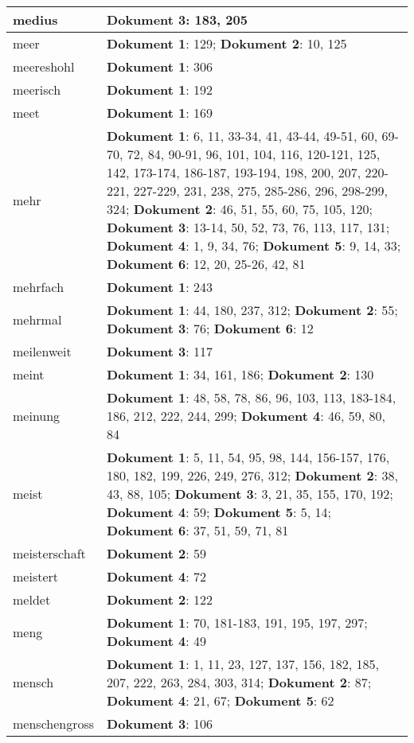\documentclass[a5paper]{article}
\begin{document}
\begin{longtable}[l]{|l|p{3in}|}
\hline
medius & \textbf{Dokument 3}: 183, 205 \\
\hline
meer & \textbf{Dokument 1}: 129; \textbf{Dokument 2}: 10, 125 \\
\hline
meereshohl & \textbf{Dokument 1}: 306 \\
\hline
meerisch & \textbf{Dokument 1}: 192 \\
\hline
meet & \textbf{Dokument 1}: 169 \\
\hline
mehr & \textbf{Dokument 1}: 6, 11, 33-34, 41, 43-44, 49-51, 60, 69-70, 72, 84, 90-91, 96, 101, 104, 116, 120-121, 125, 142, 173-174, 186-187, 193-194, 198, 200, 207, 220-221, 227-229, 231, 238, 275, 285-286, 296, 298-299, 324; \textbf{Dokument 2}: 46, 51, 55, 60, 75, 105, 120; \textbf{Dokument 3}: 13-14, 50, 52, 73, 76, 113, 117, 131; \textbf{Dokument 4}: 1, 9, 34, 76; \textbf{Dokument 5}: 9, 14, 33; \textbf{Dokument 6}: 12, 20, 25-26, 42, 81 \\
\hline
mehrfach & \textbf{Dokument 1}: 243 \\
\hline
mehrmal & \textbf{Dokument 1}: 44, 180, 237, 312; \textbf{Dokument 2}: 55; \textbf{Dokument 3}: 76; \textbf{Dokument 6}: 12 \\
\hline
meilenweit & \textbf{Dokument 3}: 117 \\
\hline
meint & \textbf{Dokument 1}: 34, 161, 186; \textbf{Dokument 2}: 130 \\
\hline
meinung & \textbf{Dokument 1}: 48, 58, 78, 86, 96, 103, 113, 183-184, 186, 212, 222, 244, 299; \textbf{Dokument 4}: 46, 59, 80, 84 \\
\hline
meist & \textbf{Dokument 1}: 5, 11, 54, 95, 98, 144, 156-157, 176, 180, 182, 199, 226, 249, 276, 312; \textbf{Dokument 2}: 38, 43, 88, 105; \textbf{Dokument 3}: 3, 21, 35, 155, 170, 192; \textbf{Dokument 4}: 59; \textbf{Dokument 5}: 5, 14; \textbf{Dokument 6}: 37, 51, 59, 71, 81 \\
\hline
meisterschaft & \textbf{Dokument 2}: 59 \\
\hline
meistert & \textbf{Dokument 4}: 72 \\
\hline
meldet & \textbf{Dokument 2}: 122 \\
\hline
meng & \textbf{Dokument 1}: 70, 181-183, 191, 195, 197, 297; \textbf{Dokument 4}: 49 \\
\hline
mensch & \textbf{Dokument 1}: 1, 11, 23, 127, 137, 156, 182, 185, 207, 222, 263, 284, 303, 314; \textbf{Dokument 2}: 87; \textbf{Dokument 4}: 21, 67; \textbf{Dokument 5}: 62 \\
\hline
menschengross & \textbf{Dokument 3}: 106 \\

\end{longtable}
\end{document}
